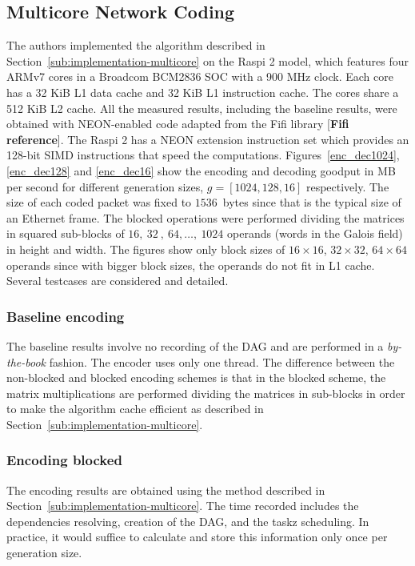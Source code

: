 \subsection{Multicore Network Coding}
\label{subs:multicore-network-coding}

The authors implemented the algorithm described in
Section~\ref{sub:implementation-multicore} on the \ac{Raspi} 2 model,
which features four ARMv7 cores in a Broadcom BCM2836 \ac{SOC}
with a 900 MHz clock. Each core has a 32 KiB L1 data cache and 32 KiB
L1 instruction cache. The cores share a 512 KiB L2 cache. All the
measured results, including the baseline results, were obtained with
NEON-enabled code adapted from the Fifi library [\textbf{Fifi reference}].
The \ac{Raspi} 2 has a NEON extension instruction set which provides
an 128-bit \ac{SIMD} instructions that speed the computations.
Figures~\ref{enc_dec1024}, \ref{enc_dec128} and
\ref{enc_dec16} show the encoding and decoding goodput in MB per
second for different generation sizes, $g = [1024, 128, 16]$
respectively. The size of each coded packet was fixed to $1536$~bytes
since that is the typical size of an Ethernet frame. The blocked operations
were performed dividing the matrices in squared sub-blocks of
$16,\ 32\ ,\ 64,\ldots,\ 1024$ operands (words in the Galois field) in
height and width. The figures show only block sizes of
$16 \times 16$, $32 \times 32$, $64 \times 64$ operands since with bigger
block sizes, the operands do not fit in L1 cache. Several testcases
are considered and detailed.

\subsubsection{Baseline encoding}
The baseline results involve no recording of the
\ac{DAG} and are performed in a \emph{by-the-book} fashion. The encoder uses
only one thread. The difference between the non-blocked and blocked
encoding schemes is that in the blocked scheme, the matrix multiplications are
performed dividing the matrices in sub-blocks in order to make the algorithm
cache efficient as described in Section~\ref{sub:implementation-multicore}.

\subsubsection{Encoding blocked}
The encoding results are obtained using the
method described in Section~\ref{sub:implementation-multicore}. The time
recorded includes the dependencies resolving, creation of the \ac{DAG},
and the taskz scheduling. In practice, it would suffice to calculate and
store this information only once per generation size.

